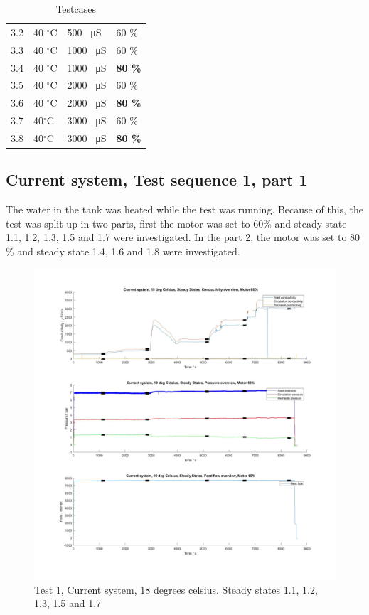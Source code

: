 \begin{table}[h]
\begin{tabular}{|p{1.4cm}||p{2cm}|p{3.2cm}|p{1.8cm}|}
 3.2 & 40 $^\circ$C &500 \SI{}{\micro\siemens}& 60 \%\\
 3.3 & 40 $^\circ$C  & 1000 \SI{}{\micro\siemens}& 60 \%\\
 3.4 & 40 $^\circ$C  & 1000 \SI{}{\micro\siemens}& \textbf{80 \%}\\
 3.5 & 40 $^\circ$C&2000 \SI{}{\micro\siemens}& 60 \%\\
 3.6 & 40 $^\circ$C &2000 \SI{}{\micro\siemens}& \textbf{80 \%}\\
 3.7 & 40$^\circ$C &3000 \SI{}{\micro\siemens}& 60 \%\\
 3.8 & 40$^\circ$C &3000 \SI{}{\micro\siemens}& \textbf{80 \%}\\
\hline
\end{tabular}
\caption{Testcases}
    \label{tab:test cases} 
\end{table}


\subsection{Current system, Test sequence 1, part 1}

The water in the tank was heated while the test was running. Because of this, the test was split up in two parts, first the motor was set to 60\% and steady state 1.1, 1.2, 1.3, 1.5 and 1.7 were investigated. In the part 2, the motor was set to 80 \% and steady state 1.4, 1.6 and 1.8 were investigated. 
\begin{figure}[H]
    \centering
    \includegraphics[width=1.1\textwidth]{overview20_60}
    \caption{Test 1, Current system, 18 degrees celsius. Steady states 1.1, 1.2, 1.3, 1.5 and 1.7 }
    \label{fig:PressConn}
\end{figure}

